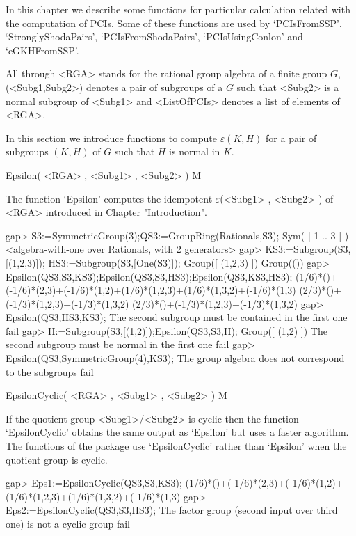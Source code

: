 
In this chapter we describe some functions for particular calculation 
related with the computation of PCIs. Some of these functions are used by 
`PCIsFromSSP', `StronglyShodaPairs', `PCIsFromShodaPairs', `PCIsUsingConlon' and `eGKHFromSSP'. 

All through <RGA> stands for the rational group algebra of a finite group $G$, (<Subg1,Subg2>) 
denotes a pair of subgroups of a $G$ such that <Subg2> is a normal subgroup of <Subg1> 
and <ListOfPCIs> denotes a list of elements of <RGA>. 



In this section we introduce functions to compute $\varepsilon(K,H)$ for a pair of subgroups 
$(K,H)$ of $G$ such that $H$ is normal in $K$. 

\>Epsilon( <RGA> , <Subg1> , <Subg2> ) M

The function `Epsilon' computes the idempotent $\varepsilon$(<Subg1> , <Subg2> ) of <RGA> 
introduced in Chapter "Introduction". 


\beginexample
    gap> S3:=SymmetricGroup(3);QS3:=GroupRing(Rationals,S3);
    Sym( [ 1 .. 3 ] )
    <algebra-with-one over Rationals, with 2 generators>
    gap> KS3:=Subgroup(S3,[(1,2,3)]); HS3:=Subgroup(S3,[One(S3)]);
    Group([ (1,2,3) ])
    Group(())
    gap> Epsilon(QS3,S3,KS3);Epsilon(QS3,S3,HS3);Epsilon(QS3,KS3,HS3);
    (1/6)*()+(-1/6)*(2,3)+(-1/6)*(1,2)+(1/6)*(1,2,3)+(1/6)*(1,3,2)+(-1/6)*(1,3)
    (2/3)*()+(-1/3)*(1,2,3)+(-1/3)*(1,3,2)
    (2/3)*()+(-1/3)*(1,2,3)+(-1/3)*(1,3,2)
    gap> Epsilon(QS3,HS3,KS3);
    The second subgroup must be contained in the first one
    fail
    gap> H:=Subgroup(S3,[(1,2)]);Epsilon(QS3,S3,H);
    Group([ (1,2) ])
    The second subgroup must be normal in the first one
    fail
    gap> Epsilon(QS3,SymmetricGroup(4),KS3);
    The group algebra does not correspond to the subgroups
    fail
\endexample


\>EpsilonCyclic( <RGA> , <Subg1> , <Subg2> ) M

If the quotient group <Subg1>/<Subg2> is cyclic then the function `EpsilonCyclic' 
obtains the same output as `Epsilon' but uses a faster algorithm. 
The functions of the package use `EpsilonCyclic' rather than `Epsilon' 
when the quotient group is cyclic.

\beginexample
    gap> Eps1:=EpsilonCyclic(QS3,S3,KS3);
    (1/6)*()+(-1/6)*(2,3)+(-1/6)*(1,2)+(1/6)*(1,2,3)+(1/6)*(1,3,2)+(-1/6)*(1,3)
    gap> Eps2:=EpsilonCyclic(QS3,S3,HS3); 
    The factor group (second input over third one) is not a cyclic group
    fail
\endexample

